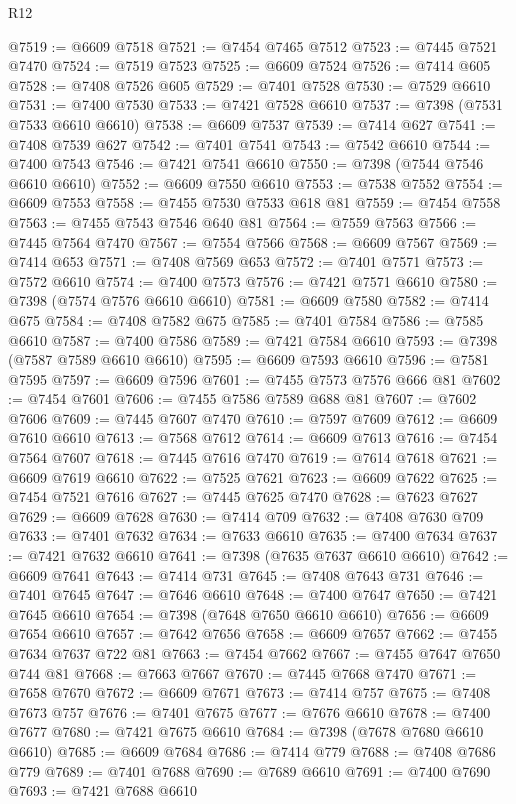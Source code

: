 \begin{lexlean}{R12}
\begin{coremodule}
@7519 := @6609 @7518
@7521 := @7454 @7465 @7512
@7523 := @7445 @7521 @7470
@7524 := @7519 @7523
@7525 := @6609 @7524
@7526 := @7414 @605
@7528 := @7408 @7526 @605
@7529 := @7401 @7528
@7530 := @7529 @6610
@7531 := @7400 @7530
@7533 := @7421 @7528 @6610
@7537 := @7398 (@7531 @7533 @6610 @6610)
@7538 := @6609 @7537
@7539 := @7414 @627
@7541 := @7408 @7539 @627
@7542 := @7401 @7541
@7543 := @7542 @6610
@7544 := @7400 @7543
@7546 := @7421 @7541 @6610
@7550 := @7398 (@7544 @7546 @6610 @6610)
@7552 := @6609 @7550 @6610
@7553 := @7538 @7552
@7554 := @6609 @7553
@7558 := @7455 @7530 @7533 @618 @81
@7559 := @7454 @7558
@7563 := @7455 @7543 @7546 @640 @81
@7564 := @7559 @7563
@7566 := @7445 @7564 @7470
@7567 := @7554 @7566
@7568 := @6609 @7567
@7569 := @7414 @653
@7571 := @7408 @7569 @653
@7572 := @7401 @7571
@7573 := @7572 @6610
@7574 := @7400 @7573
@7576 := @7421 @7571 @6610
@7580 := @7398 (@7574 @7576 @6610 @6610)
@7581 := @6609 @7580
@7582 := @7414 @675
@7584 := @7408 @7582 @675
@7585 := @7401 @7584
@7586 := @7585 @6610
@7587 := @7400 @7586
@7589 := @7421 @7584 @6610
@7593 := @7398 (@7587 @7589 @6610 @6610)
@7595 := @6609 @7593 @6610
@7596 := @7581 @7595
@7597 := @6609 @7596
@7601 := @7455 @7573 @7576 @666 @81
@7602 := @7454 @7601
@7606 := @7455 @7586 @7589 @688 @81
@7607 := @7602 @7606
@7609 := @7445 @7607 @7470
@7610 := @7597 @7609
@7612 := @6609 @7610 @6610
@7613 := @7568 @7612
@7614 := @6609 @7613
@7616 := @7454 @7564 @7607
@7618 := @7445 @7616 @7470
@7619 := @7614 @7618
@7621 := @6609 @7619 @6610
@7622 := @7525 @7621
@7623 := @6609 @7622
@7625 := @7454 @7521 @7616
@7627 := @7445 @7625 @7470
@7628 := @7623 @7627
@7629 := @6609 @7628
@7630 := @7414 @709
@7632 := @7408 @7630 @709
@7633 := @7401 @7632
@7634 := @7633 @6610
@7635 := @7400 @7634
@7637 := @7421 @7632 @6610
@7641 := @7398 (@7635 @7637 @6610 @6610)
@7642 := @6609 @7641
@7643 := @7414 @731
@7645 := @7408 @7643 @731
@7646 := @7401 @7645
@7647 := @7646 @6610
@7648 := @7400 @7647
@7650 := @7421 @7645 @6610
@7654 := @7398 (@7648 @7650 @6610 @6610)
@7656 := @6609 @7654 @6610
@7657 := @7642 @7656
@7658 := @6609 @7657
@7662 := @7455 @7634 @7637 @722 @81
@7663 := @7454 @7662
@7667 := @7455 @7647 @7650 @744 @81
@7668 := @7663 @7667
@7670 := @7445 @7668 @7470
@7671 := @7658 @7670
@7672 := @6609 @7671
@7673 := @7414 @757
@7675 := @7408 @7673 @757
@7676 := @7401 @7675
@7677 := @7676 @6610
@7678 := @7400 @7677
@7680 := @7421 @7675 @6610
@7684 := @7398 (@7678 @7680 @6610 @6610)
@7685 := @6609 @7684
@7686 := @7414 @779
@7688 := @7408 @7686 @779
@7689 := @7401 @7688
@7690 := @7689 @6610
@7691 := @7400 @7690
@7693 := @7421 @7688 @6610

\end{coremodule}
\end{lexlean}
